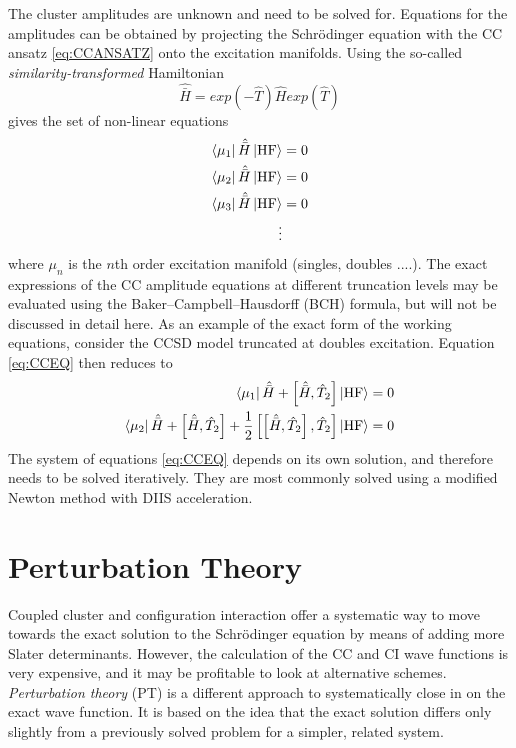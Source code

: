 The cluster amplitudes are unknown and need to be solved for. Equations for the amplitudes can be obtained by projecting the Schrödinger equation with the CC ansatz \ref{eq:CCANSATZ} onto the excitation manifolds. Using the so-called \emph{similarity-transformed} Hamiltonian
\begin{equation}
\hat{\bar{H}} = exp(-\hat{T}) \hat{H} exp(\hat{T})
\end{equation} 
\noindent gives the set of non-linear equations
\begin{align}
\begin{split}
\bra{\mu_1}\hat{\bar{H}}\ket{\text{HF}} &= 0 \\
\bra{\mu_2}\hat{\bar{H}}\ket{\text{HF}} &= 0 \\
\bra{\mu_3}\hat{\bar{H}}\ket{\text{HF}} &= 0 \\
\vdots & 
\end{split} 
\label{eq:CCEQ}
\end{align}
\noindent where $\mu_n$ is the $n$th order excitation manifold (singles, doubles ....). The exact expressions of the CC amplitude equations at different truncation levels may be evaluated using the 
Baker–Campbell–Hausdorff (BCH) formula, but will not be discussed in detail here. As an example of the exact form of the working equations, consider the CCSD model truncated at doubles excitation. Equation \ref{eq:CCEQ} then reduces to
\begin{align}
\bra{\smash{\mu_1}} \hat{\bar{H}} + \left[\hat{\bar{H}},\hat{T}_2\right] \ket{\smash{\text{HF}}} = 0 
\label{eq:CCSDEQSINGLES}
\\
\bra{\smash{\mu_2}} \hat{\bar{H}} + \left[\hat{\bar{H}},\hat{T}_2\right] + \frac{1}{2} \left[ \left[ \hat{\bar{H}},\hat{T}_2\right],\hat{T}_2\right] \ket{\smash{\text{HF}}} = 0
\label{eq:CCSDEQDOUBLES}
\end{align}
The system of equations \ref{eq:CCEQ} depends on its own solution, and therefore needs to be solved iteratively. They are most commonly solved using a modified Newton method with DIIS acceleration. 

\section{Perturbation Theory}

Coupled cluster and configuration interaction offer a systematic way to move towards the exact solution to the Schrödinger equation by means of adding more Slater determinants. However, the calculation of the  CC and CI wave functions is very expensive, and it may be profitable to look at alternative schemes. \emph{Perturbation theory} (PT) is a different approach to systematically close in on the exact wave function. It is based on the idea that the exact solution differs only slightly from a previously solved problem for a simpler, related system.

